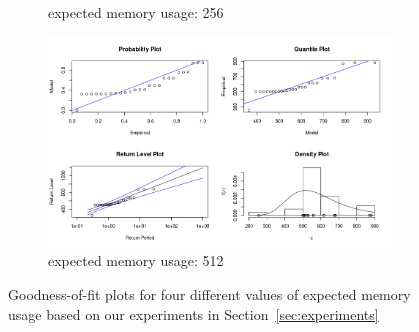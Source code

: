\documentclass{article}
\begin{document}
\begin{figure}
\begin{subfigure}[t]{0.49\textwidth}
    \caption{expected memory usage: \SI{256}{\mebi\byte}}
  \end{subfigure}
  \begin{subfigure}[t]{0.49\textwidth}
    \centering
    \includegraphics[width=\textwidth]{../plots/memory_fit_512.png}
    \caption{expected memory usage: \SI{512}{\mebi\byte}}
  \end{subfigure}
  \caption{Goodness-of-fit plots for four different values of expected memory
    usage based on our experiments in Section~\ref{sec:experiments}}
  \label{fig:gumbel_fit}
\end{figure}



\end{document}
